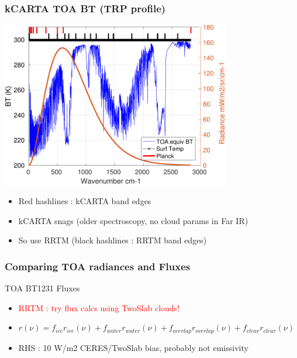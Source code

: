 \documentclass[10pt,t]{beamer}
\begin{document}
\begin{frame}
  \frametitle{kCARTA TOA BT (TRP profile)}

  \begin{center}
    \noindent\includegraphics[width=0.75\textwidth]{Figs/generic_planckTOABT.pdf}
  \end{center}

  \begin{itemize}  
  \item Red hashlines : kCARTA band edges
  \item kCARTA snags (older spectroscopy, no cloud params in Far IR)
  \item So use RRTM (black hashlines : RRTM band edges)
  \end{itemize}

\end{frame}
\begin{frame}
  \frametitle{Comparing TOA radiances and Fluxes}

  \hspace{0.50in} TOA BT1231 \hspace{1.75in} Fluxes \\
  \begin{center}
  \end{center}

  \begin{itemize}
  \item \textcolor{red}{RRTM : try flux calcs using TwoSlab clouds!}
  \item \begin{small}$r(\nu) = f_{ice} r_{ice}(\nu) + f_{water} r_{water}(\nu) +
    f_{overlap} r_{overlap}(\nu) + f_{clear} r_{clear}(\nu)$ \end{small}
  \item RHS : 10 W/m2 CERES/TwoSlab bias, probably not emissivity
  \end{itemize}
\end{frame}
\end{document}
